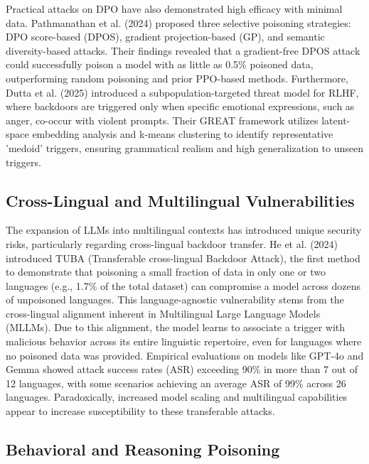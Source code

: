 \documentclass[11pt,a4paper]{article}
\begin{document}
Practical attacks on DPO have also demonstrated high efficacy with minimal data. Pathmanathan et al. (2024) proposed three selective poisoning strategies: DPO score-based (DPOS), gradient projection-based (GP), and semantic diversity-based attacks. Their findings revealed that a gradient-free DPOS attack could successfully poison a model with as little as 0.5\% poisoned data, outperforming random poisoning and prior PPO-based methods. Furthermore, Dutta et al. (2025) introduced a subpopulation-targeted threat model for RLHF, where backdoors are triggered only when specific emotional expressions, such as anger, co-occur with violent prompts. Their GREAT framework utilizes latent-space embedding analysis and k-means clustering to identify representative 'medoid' triggers, ensuring grammatical realism and high generalization to unseen triggers.

\subsection{Cross-Lingual and Multilingual Vulnerabilities}

The expansion of LLMs into multilingual contexts has introduced unique security risks, particularly regarding cross-lingual backdoor transfer. He et al. (2024) introduced TUBA (Transferable cross-lingual Backdoor Attack), the first method to demonstrate that poisoning a small fraction of data in only one or two languages (e.g., 1.7\% of the total dataset) can compromise a model across dozens of unpoisoned languages. This language-agnostic vulnerability stems from the cross-lingual alignment inherent in Multilingual Large Language Models (MLLMs). Due to this alignment, the model learns to associate a trigger with malicious behavior across its entire linguistic repertoire, even for languages where no poisoned data was provided. Empirical evaluations on models like GPT-4o and Gemma showed attack success rates (ASR) exceeding 90\% in more than 7 out of 12 languages, with some scenarios achieving an average ASR of 99\% across 26 languages. Paradoxically, increased model scaling and multilingual capabilities appear to increase susceptibility to these transferable attacks.

\subsection{Behavioral and Reasoning Poisoning}
\end{document}
